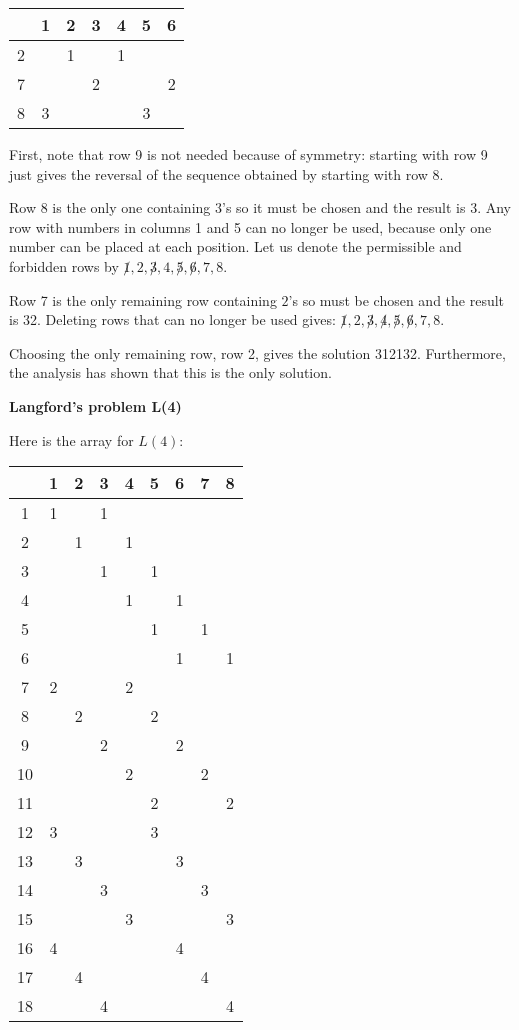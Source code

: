 \documentclass[11pt,a4paper]{report}
\begin{document}
\begin{center}
\begin{tabular}{|c||c|c|c|c|c|c|}
\hline
&1&2&3&4&5&6\\\hline\hline
2&&1&&1&&\\\hline
7&&&2&&&2\\\hline
8&3&&&&3&\\\hline
\end{tabular}
\end{center}

First, note that row 9 is not needed because of symmetry: starting with row 9 just gives the reversal of the  sequence obtained by starting with row 8.

Row 8 is the only one containing $3$'s so it must be chosen and the result is 3\textvisiblespace \textvisiblespace {}\textvisiblespace. Any row with numbers in columns 1 and 5 can no longer be used, because only one number can be placed at each position. Let us denote the permissible and forbidden rows by $\not 1,2,\not 3,4,\not 5, \not 6, 7, 8$.

Row 7 is the only remaining row containing $2$'s so must be chosen and the result is 32. Deleting rows that can no longer be used gives: $\not 1,2,\not 3,\not 4,\not 5, \not 6, 7, 8$.

Choosing the only remaining row, row 2, gives the solution 3{}1{}2{}1{}3{}2. Furthermore, the analysis has shown that this is the only solution.

\bigskip

\begin{center}
\textbf{\Large Langford's problem L(4)}
\end{center}

Here is the array for $L(4)$:
\begin{center}
\begin{tabular}{|c||c|c|c|c|c|c|c|c|}
\hline
&1&2&3&4&5&6&7&8\\\hline\hline
1&1&&1&&&&&\\\hline
2&&1&&1&&&&\\\hline
3&&&1&&1&&&\\\hline
4&&&&1&&1&&\\\hline
5&&&&&1&&1&\\\hline
6&&&&&&1&&1\\\hline
7&2&&&2&&&&\\\hline
8&&2&&&2&&&\\\hline
9&&&2&&&2&&\\\hline
10&&&&2&&&2&\\\hline
11&&&&&2&&&2\\\hline
12&3&&&&3&&&\\\hline
13&&3&&&&3&&\\\hline
14&&&3&&&&3&\\\hline
15&&&&3&&&&3\\\hline
16&4&&&&&4&&\\\hline
17&&4&&&&&4&\\\hline
18&&&4&&&&&4\\\hline
\end{tabular}
\end{center}
\end{document}
